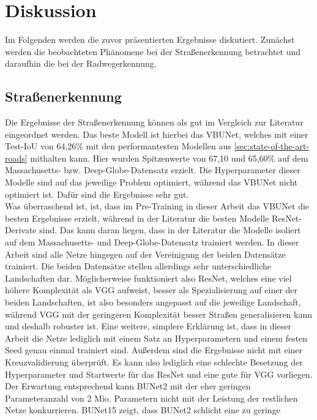 \chapter{Diskussion}

Im Folgenden werden die zuvor präsentierten Ergebnisse diskutiert. Zunächst werden die beobachteten Phänomene 
bei der Straßenerkennung betrachtet und daraufhin die bei der Radwegerkennung.

\section{Straßenerkennung}

Die Ergebnisse der Straßenerkennung können als gut im Vergleich zur Literatur eingeordnet werden. 
Das beste Modell ist hierbei das \ac{VBUNet}, welches mit einer Test-IoU von 64,26\% mit den 
performantesten Modellen aus \autoref{sec:state-of-the-art-roads} mithalten kann. Hier wurden 
Spitzenwerte von 67,10 und 65,60\% auf dem Massachusetts- bzw. Deep-Globe-Datensatz erzielt. 
Die Hyperparameter dieser Modelle sind auf das jeweilige Problem optimiert, während das VBUNet nicht optimiert ist. 
Dafür sind die Ergebnisse sehr gut. \\  
Was überraschend ist, ist, dass im Pre-Training in dieser Arbeit 
das VBUNet die besten Ergebnisse erzielt, während in der Literatur die besten Modelle ResNet-Derivate sind. 
Das kann daran liegen, dass in der Literatur die Modelle isoliert auf dem Massachusetts- und Deep-Globe-Datensatz 
trainiert werden. In dieser Arbeit sind alle Netze hingegen auf der Vereinigung der beiden Datensätze trainiert. 
Die beiden Datensätze stellen allerdings sehr unterschiedliche Landschaften dar. 
Möglicherweise funktioniert also ResNet, welches eine viel höhere Komplexität als VGG aufweist, besser 
als Spezialisierung auf einer der beiden Landschaften, ist also besonders angepasst auf die jeweilige Landschaft, 
während VGG mit der geringeren Komplexität besser Straßen generalisieren kann und deshalb robuster ist. 
Eine weitere, simplere Erklärung ist, dass in dieser Arbeit die Netze lediglich mit einem Satz 
an Hyperparametern und einem festen Seed genau einmal trainiert sind. Außerdem sind die Ergebnisse 
nicht mit einer Kreuzvalidierung überprüft.
Es kann also lediglich eine schlechte Besetzung der Hyperparameter und Startwerte für das ResNet und eine 
gute für VGG vorliegen. \\
Der Erwartung entsprechend kann BUNet2 mit der eher geringen Parameteranzahl von 2 Mio. Parametern nicht 
mit der Leistung der restlichen Netze konkurrieren. BUNet15 zeigt, dass BUNet2 schlicht eine zu geringe 
